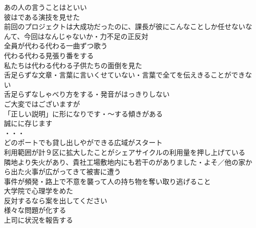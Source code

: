 あの人の言うことはといい\\

彼はである演技を見せた\\

前回のプロジェクトは大成功だったのに、課長が彼にこんなことしか任せないなんて、今回はなんじゃないか・力不足の正反対\\

全員が代わる代わる一曲ずつ歌う\\
代わる代わる見張り番をする\\
私たちは代わる代わる子供たちの面倒を見た\\

舌足らずな文章・言葉に言いくせていない・言葉で全てを伝えきることができない\\
舌足らずなしゃべり方をする・発音がはっきりしない\\

ご大変ではございますが\\

「正しい説明」に形になりです・〜する傾きがある\\
誠にに存じます\\
・・・\\

どのポートでも貸し出しやができる広域がスタート\\
利用範囲が計９区に拡大したことがシェアサイクルの利用量を押し上げている\\

隣地より失火があり、貴社工場敷地内にも若干のがありました・よそ／他の家から出た火事が広がってきて被害に遭う\\
事件が頻発・路上で不意を襲って人の持ち物を奪い取り逃げること\\

大学院で心理学をめた\\
反対するなら案を出してください\\
様々な問題が化する\\
上司に状況を報告する\\

